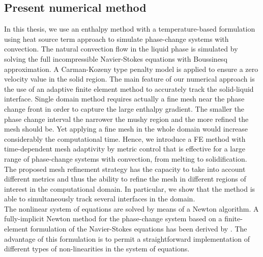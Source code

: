\subsection{Present numerical method}
In this thesis, we use an enthalpy method with a temperature-based formulation using heat source term approach to simulate phase-change systems with convection.
The natural convection flow in the liquid phase is simulated by solving the full incompressible Navier-Stokes equations with Boussinesq approximation.
A Carman-Kozeny type penalty model is applied to ensure a zero velocity value in the solid region.
The main feature of our numerical approach is the use of an adaptive finite element method to accurately track the solid-liquid interface.
Single domain method requires actually a fine mesh near the phase change front in order to capture the large enthalpy gradient. 
The smaller the phase change interval the narrower the mushy region and the more refined the mesh should be.
Yet applying a fine mesh in the whole domain would increase considerably the computational time.
Hence, we introduce a FE method with time-dependent mesh adaptivity by metric control that is  effective for a large range of phase-change systems with convection, from melting to solidification. The proposed mesh refinement strategy has the capacity to take into account different metrics and thus the ability to refine the mesh in different regions of interest in the computational domain. In particular, we show that the method is able to simultaneously track several interfaces in the domain.\\ %
The nonlinear system of equations are solved by means of a Newton algorithm.
A fully-implicit Newton method for the phase-change system based on a finite-element formulation of the Navier-Stokes equations has been derived by \citep{dan-2014-JCP}.
The advantage of this formulation is to  permit a straightforward implementation of different types of non-linearities in the system of equations.

